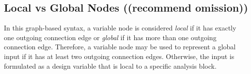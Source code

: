 
%
%

\subsection{Local vs Global Nodes ((recommend omission))}

  In this graph-based syntax, a variable node is considered \emph{local} if it has exactly one outgoing connection edge or \emph{global} if it has more than one outgoing connection edge. Therefore, a variable node may be used to represent a global input if it has at least two outgoing connection edges. Otherwise, the input is formulated as a design variable that is local to a specific analysis block.
%

